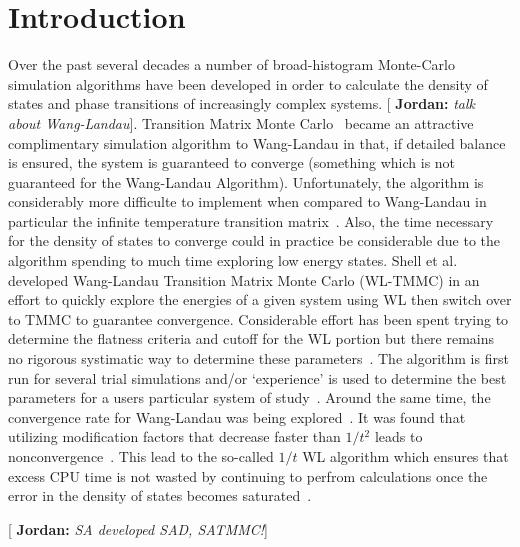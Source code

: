 \documentclass[letterpaper,twocolumn,amsmath,amssymb,pre,aps,10pt]{revtex4-1}
\newcommand{\blue}[1]{{\bf \color{blue} #1}}
\newcommand{\jpsays}[1]{{\color{red} [\blue{Jordan:} \emph{#1}]}}
\begin{document}
\section{Introduction}
Over the past several decades a number of broad-histogram Monte-Carlo simulation algorithms have been developed in order to calculate the density of states and phase transitions of increasingly complex systems.  \jpsays{talk about Wang-Landau}.
Transition Matrix Monte Carlo~\cite{wang1999transition, swendsen1999transition, fitzgerald2000monte} became an attractive complimentary simulation algorithm to Wang-Landau in that, if detailed balance is ensured, the system is guaranteed to converge (something which is not guaranteed for the Wang-Landau Algorithm).  Unfortunately, the algorithm is considerably more difficulte to implement when compared to Wang-Landau in particular the infinite temperature transition matrix~\cite{wang2002transition}.  Also, the time necessary for the density of states to converge could in practice be considerable due to the algorithm spending to much time exploring low energy states.  Shell et al.~\cite{shell2003improved, shell2004flat} developed Wang-Landau Transition Matrix Monte Carlo (WL-TMMC) in an effort to quickly explore the energies of a given system using WL then switch over to TMMC to guarantee convergence. Considerable effort has been spent trying to determine the flatness criteria and cutoff for the WL portion but there remains no rigorous systimatic way to determine these parameters~\cite{rane2013monte}.  The algorithm is first run for several trial simulations and/or `experience' is used to determine the best parameters for a users particular system of study~\cite{siderius2013use}.  Around the same time, the convergence rate for Wang-Landau was being explored~\cite{zhou2005understanding}.  It was found that utilizing modification factors that decrease faster than $1/t^2$ leads to nonconvergence~\cite{belardinelli2007fast}.  This lead to the so-called $1/t$ WL algorithm which ensures that excess CPU time is not wasted by continuing to perfrom calculations once the error in the density of states becomes saturated~\cite{belardinelli2008analysis}.

\jpsays{SA developed SAD, SATMMC!}
\end{document}
